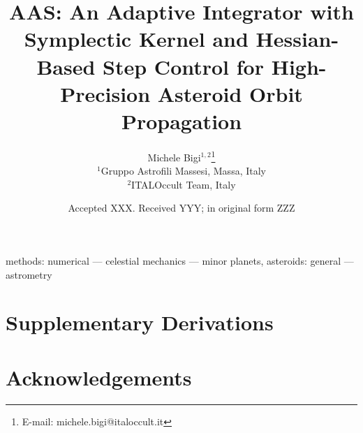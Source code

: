 \documentclass[fleqn,usenatbib]{rasti}
\begin{document}
\title[AAS: Adaptive Integrator with Symplectic Kernel]{AAS: An Adaptive Integrator with Symplectic Kernel and Hessian-Based Step
  Control for High-Precision Asteroid Orbit Propagation}

\author[M. Bigi]{
Michele Bigi$^{1,2}$\thanks{E-mail: michele.bigi@italoccult.it}\\
$^{1}$Gruppo Astrofili Massesi, Massa, Italy\\
$^{2}$ITALOccult Team, Italy
}

\date{Accepted XXX. Received YYY; in original form ZZZ}
\maketitle

\begin{abstract}

\end{abstract}

\begin{keywords}
  methods: numerical ---
  celestial mechanics ---
  minor planets, asteroids: general ---
  astrometry
\end{keywords}









\appendix
\section{Supplementary Derivations}





\section*{Acknowledgements}

\end{document}
